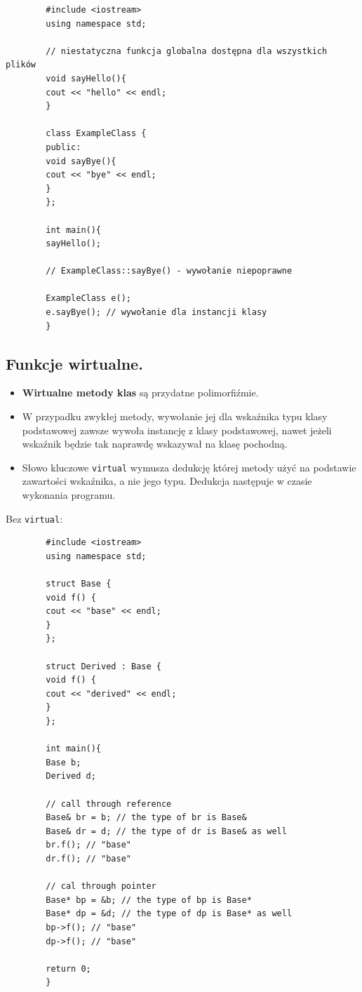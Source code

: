 \documentclass[12pt]{article}
\begin{document}
    \begin{verbatim}
        #include <iostream>
        using namespace std;

        // niestatyczna funkcja globalna dostępna dla wszystkich plików
        void sayHello(){
        cout << "hello" << endl;
        }

        class ExampleClass {
        public:
        void sayBye(){
        cout << "bye" << endl;
        }
        };

        int main(){
        sayHello();

        // ExampleClass::sayBye() - wywołanie niepoprawne

        ExampleClass e();
        e.sayBye(); // wywołanie dla instancji klasy
        }
    \end{verbatim}

    \subsection{Funkcje wirtualne.}
    \begin{itemize}
        \item \textbf{Wirtualne metody klas} są przydatne polimorfiźmie.
        \item W przypadku zwykłej metody, wywołanie jej dla wskaźnika typu klasy podstawowej zawsze wywoła instancję
        z klasy podstawowej, nawet jeżeli wskaźnik będzie tak naprawdę wskazywał na klasę pochodną.
        \item Słowo kluczowe \texttt{virtual} wymusza dedukcję której metody użyć na podstawie zawartości wskaźnika,
        a nie jego typu. Dedukcja następuje w czasie wykonania programu.
    \end{itemize}

    Bez \texttt{virtual}:
    \begin{verbatim}
        #include <iostream>
        using namespace std;

        struct Base {
        void f() {
        cout << "base" << endl;
        }
        };

        struct Derived : Base {
        void f() {
        cout << "derived" << endl;
        }
        };

        int main(){
        Base b;
        Derived d;

        // call through reference
        Base& br = b; // the type of br is Base&
        Base& dr = d; // the type of dr is Base& as well
        br.f(); // "base"
        dr.f(); // "base"

        // cal through pointer
        Base* bp = &b; // the type of bp is Base*
        Base* dp = &d; // the type of dp is Base* as well
        bp->f(); // "base"
        dp->f(); // "base"

        return 0;
        }
    \end{verbatim}
\end{document}
